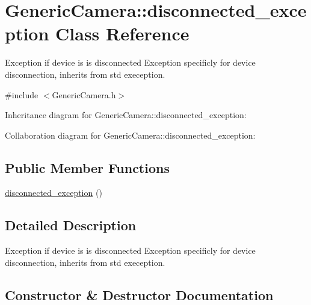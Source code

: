 \hypertarget{class_generic_camera_1_1disconnected__exception}{}\section{Generic\+Camera\+:\+:disconnected\+\_\+exception Class Reference}
\label{class_generic_camera_1_1disconnected__exception}


Exception if device is is disconnected Exception specificly for device disconnection, inherits from std exeception.  




{\ttfamily \#include $<$Generic\+Camera.\+h$>$}



Inheritance diagram for Generic\+Camera\+:\+:disconnected\+\_\+exception\+:


Collaboration diagram for Generic\+Camera\+:\+:disconnected\+\_\+exception\+:
\subsection*{Public Member Functions}
\begin{DoxyCompactItemize}
\item 
\hyperlink{class_generic_camera_1_1disconnected__exception_ac3e9d17d6848faa8bf458c19ebe21812}{disconnected\+\_\+exception} ()
\end{DoxyCompactItemize}


\subsection{Detailed Description}
Exception if device is is disconnected Exception specificly for device disconnection, inherits from std exeception. 

\subsection{Constructor \& Destructor Documentation}
